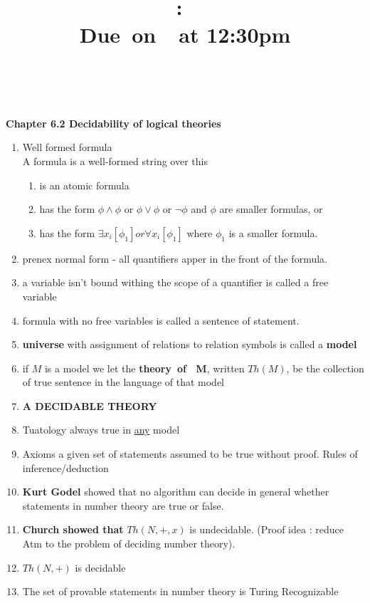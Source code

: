 \documentclass{article}
\title{
  \vspace{2in}
  \textmd{\textbf{\hmwkClass:\ \hmwkTitle}}\\
  \normalsize\vspace{0.1in}\small{Due\ on\ \hmwkDueDate\ at 12:30pm}\\
  \vspace{0.1in}\large{\textit{\hmwkClassInstructor\ \hmwkClassTime}}
  \vspace{3in}
}
\author{\textbf{\hmwkAuthorName}}
\date{}
\newcommand{\imp}[1]{\textbf{#1}}
\begin{document}
\maketitle

\pagebreak

\textbf{Chapter 6.2 Decidability of logical theories}

\begin{enumerate}[1., leftmargin = 0.6cm]
\itemsep0em
\item Well formed formula\\
    A formula is a well-formed string over this 
    \begin{enumerate}[1., leftmargin = 0.6cm]
    \itemsep0em
        \item is an atomic formula
        \item has the form $\phi \wedge \phi$ or $\phi \vee \phi$ or $\neg \phi$ and $\phi$ are 
            smaller formulas, or
        \item has the form $\exists x_i [\phi_1] or \forall x_i[\phi_1]$ where $\phi_1$ is a
            smaller formula.
    \end{enumerate}
    \item prenex normal form - all quantifiers apper in the front of the formula.
    \item a variable isn't bound withing the scope of a quantifier is called a free variable
    \item formula with no free variables is called a sentence of statement.
    \item \textbf{universe} with  assignment of relations to relation symbols is called a \textbf{model}

    \item if $M$ is a model we let the  \imp{theory\ of \ M}, written $Th(M)$, be the collection of
        true sentence in the language of that model

    \item \imp{A DECIDABLE THEORY}
    \item Tuatology always true in \underline{any} model
    \item Axioms a given set of statements assumed to be true without proof.
    \teim Rules of inference/deduction

        
    \item \imp{Kurt Godel} showed that no algorithm can decide in general whether statements in number theory are true or false.
        \item \imp{Church showed that } $Th(N,+,x)$ is undecidable. (Proof idea :
            reduce Atm to the problem of deciding number theory).
        \item $Th(N,+)$ is decidable
    \item The set of provable statements in number theory is Turing Recognizable
        

\end{enumerate}
\end{document}
